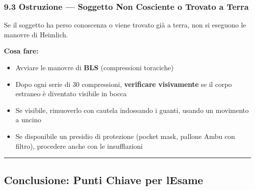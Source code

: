 \documentclass[a4paper,11pt]{article}
\providecommand{\tightlist}{%
  \setlength{\itemsep}{0pt}\setlength{\parskip}{0pt}}
\begin{document}
\subsubsection{9.3 Ostruzione --- Soggetto Non Cosciente o Trovato a
      Terra}\label{ostruzione-soggetto-non-cosciente-o-trovato-a-terra}

Se il soggetto ha perso conoscenza o viene trovato già a terra, non si
eseguono le manovre di Heimlich.

\textbf{Cosa fare:}

\begin{itemize}
      \tightlist
      \item
            Avviare le manovre di \textbf{BLS} (compressioni toraciche)
      \item
            Dopo ogni serie di 30 compressioni, \textbf{verificare visivamente} se
            il corpo estraneo è diventato visibile in bocca
      \item
            Se visibile, rimuoverlo con cautela indossando i guanti, usando un
            movimento a uncino
      \item
            Se disponibile un presidio di protezione (pocket mask, pallone Ambu
            con filtro), procedere anche con le insufflazioni
\end{itemize}

\begin{center}\rule{0.5\linewidth}{0.5pt}\end{center}

\subsection{Conclusione: Punti Chiave per
      l\textquotesingle Esame}\label{conclusione-punti-chiave-per-lesame-4}
\end{document}
